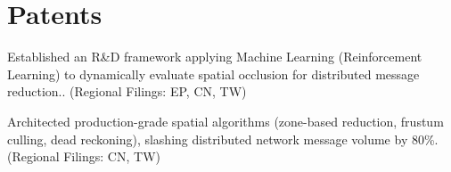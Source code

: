 \section{Patents}
\begin{resumeitems}
\item Established an R\&D framework applying Machine Learning (Reinforcement Learning) to dynamically evaluate spatial occlusion for distributed message reduction.. (Regional Filings: EP, CN, TW)
\end{resumeitems}
\begin{resumeitems}
\item Architected production-grade spatial algorithms (zone-based reduction, frustum culling, dead reckoning), slashing distributed network message volume by 80\%. (Regional Filings: CN, TW)
\end{resumeitems}
